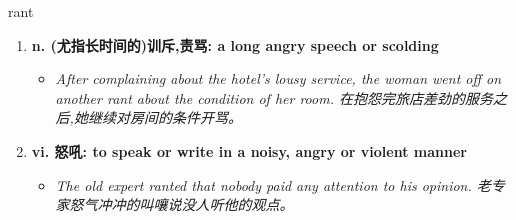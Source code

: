 
\begin{frame}
{\huge rant}
\begin{center}
\begin{enumerate}\Large
  \item \textbf{n. (尤指长时间的)训斥,责骂: a long angry speech or scolding}
  \begin{itemize}
    \item \em{\Large{After complaining about the hotel’s lousy service, the woman went off on another rant about the condition of her room. 在抱怨完旅店差劲的服务之后,她继续对房间的条件开骂。}}
  \end{itemize}
  \item \textbf{vi. 怒吼: to speak or write in a noisy, angry or violent manner}
  \begin{itemize}
    \item \em{\Large{The old expert ranted that nobody paid any attention to his opinion. 老专家怒气冲冲的叫嚷说没人听他的观点。}}
  \end{itemize}
\end{enumerate}
\end{center}
\end{frame}
